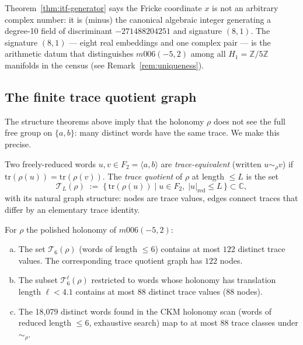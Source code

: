 \begin{remark}
Theorem~\ref{thm:itf-generator} says the Fricke coordinate $x$ is not an
arbitrary complex number: it is (minus) the canonical algebraic integer
generating a degree-10 field of discriminant $-271488204251$ and signature
$(8,1)$. The signature $(8,1)$ — eight real embeddings and one complex
pair — is the arithmetic datum that distinguishes $m006(-5,2)$ among all
$H_1 = \mathbb{Z}/5\mathbb{Z}$ manifolds in the census
(see Remark~\ref{rem:uniqueness}).
\end{remark}

\subsection{The finite trace quotient graph}
\label{subsec:trace-quotient}

The structure theorems above imply that the holonomy $\rho$ does not
see the full free group on $\{a, b\}$: many distinct words have the same
trace. We make this precise.

\begin{definition}
Two freely-reduced words $u, v \in F_2 = \langle a, b \rangle$ are
\emph{trace-equivalent} (written $u \sim_\rho v$) if
$\mathrm{tr}(\rho(u)) = \mathrm{tr}(\rho(v))$.
The \emph{trace quotient} of $\rho$ at length $\leq L$ is the set
\[
  \mathcal{T}_L(\rho) \;:=\;
  \{\, \mathrm{tr}(\rho(u)) \mid u \in F_2,\; |u|_{\mathrm{red}} \leq L\,\} \subset \mathbb{C},
\]
with its natural graph structure: nodes are trace values, edges connect
traces that differ by an elementary trace identity.
\end{definition}

\begin{theorem}
\label{thm:trace-quotient}
For $\rho$ the polished holonomy of $m006(-5,2)$:
\begin{enumerate}[(a)]
  \item The set $\mathcal{T}_6(\rho)$ (words of length $\leq 6$) contains
        at most $122$ distinct trace values. The corresponding trace quotient
        graph has $122$ nodes.
  \item The subset $\mathcal{T}_6^{\ell}(\rho)$ restricted to words whose
        holonomy has translation length $\ell < 4.1$ contains at most
        $88$ distinct trace values (88 nodes).
  \item The 18,079 distinct words found in the CKM holonomy scan (words
        of reduced length $\leq 6$, exhaustive search) map to at most
        $88$ trace classes under $\sim_\rho$.
\end{enumerate}
\end{theorem}

